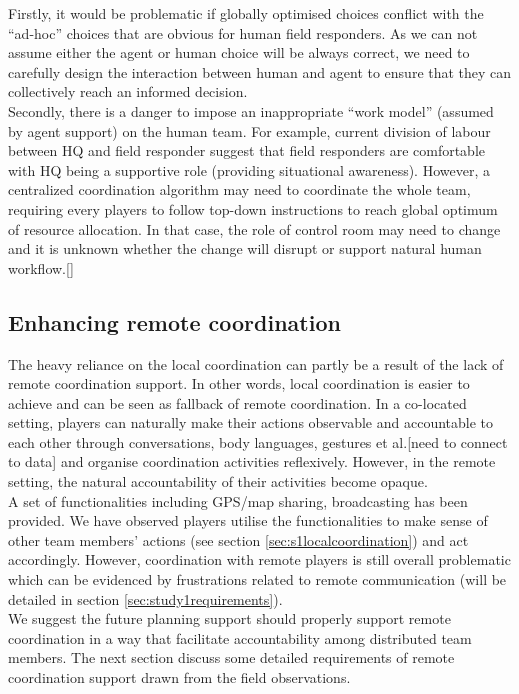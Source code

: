 Firstly, it would be problematic if globally optimised choices conflict with the ``ad-hoc'' choices that are obvious for human field responders. As we can not assume either the agent or human choice will be always correct, we need to carefully design the interaction between human and agent to ensure that they can collectively reach an informed decision.\\

Secondly, there is a danger to impose an inappropriate ``work model'' (assumed by agent support) on the human team. For example, current division of labour between HQ and field responder suggest that field responders are comfortable with HQ being a supportive role (providing situational awareness). However, a centralized coordination algorithm may need to coordinate the whole team, requiring every players to follow top-down instructions to reach global optimum of resource allocation. In that case, the role of control room may need to change and it is unknown whether the change will disrupt or support natural human workflow.[] \\

\subsection{Enhancing remote coordination}
The heavy reliance on the local coordination can partly be a result of the lack of remote coordination support. In other words, local coordination is easier to achieve and can be seen as fallback of remote coordination. In a co-located setting, players can naturally make their actions observable and accountable to each other through conversations, body languages, gestures et al.[need to connect to data]  and organise coordination activities reflexively. However, in the remote setting, the natural accountability of their activities become opaque.\\

A set of functionalities including GPS/map sharing, broadcasting has been provided. We have observed players utilise the functionalities to make sense of other team members' actions (see section \ref{sec:s1localcoordination}) and act accordingly. However, coordination with remote players is still overall problematic which can be evidenced by frustrations related to remote communication (will be detailed in section \ref{sec:study1requirements}).\\

We suggest the future planning support should properly support remote coordination in a way that facilitate accountability among distributed team members. The next section discuss some detailed requirements of remote coordination support drawn from the field observations.\\

